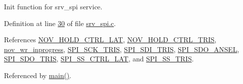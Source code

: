 Init function for srv\+\_\+spi service. 



Definition at line \hyperlink{a00032_source_l00030}{30} of file \hyperlink{a00032_source}{srv\+\_\+spi.\+c}.



References \hyperlink{a00013_source_l00122}{N\+O\+V\+\_\+\+H\+O\+L\+D\+\_\+\+C\+T\+R\+L\+\_\+\+L\+A\+T}, \hyperlink{a00013_source_l00121}{N\+O\+V\+\_\+\+H\+O\+L\+D\+\_\+\+C\+T\+R\+L\+\_\+\+T\+R\+I\+S}, \hyperlink{a00060_source_l00019}{nov\+\_\+wr\+\_\+inprogress}, \hyperlink{a00013_source_l00113}{S\+P\+I\+\_\+\+S\+C\+K\+\_\+\+T\+R\+I\+S}, \hyperlink{a00013_source_l00118}{S\+P\+I\+\_\+\+S\+D\+I\+\_\+\+T\+R\+I\+S}, \hyperlink{a00013_source_l00116}{S\+P\+I\+\_\+\+S\+D\+O\+\_\+\+A\+N\+S\+E\+L}, \hyperlink{a00013_source_l00115}{S\+P\+I\+\_\+\+S\+D\+O\+\_\+\+T\+R\+I\+S}, \hyperlink{a00013_source_l00110}{S\+P\+I\+\_\+\+S\+S\+\_\+\+C\+T\+R\+L\+\_\+\+L\+A\+T}, and \hyperlink{a00013_source_l00111}{S\+P\+I\+\_\+\+S\+S\+\_\+\+T\+R\+I\+S}.



Referenced by \hyperlink{a00048_source_l00080}{main()}.


